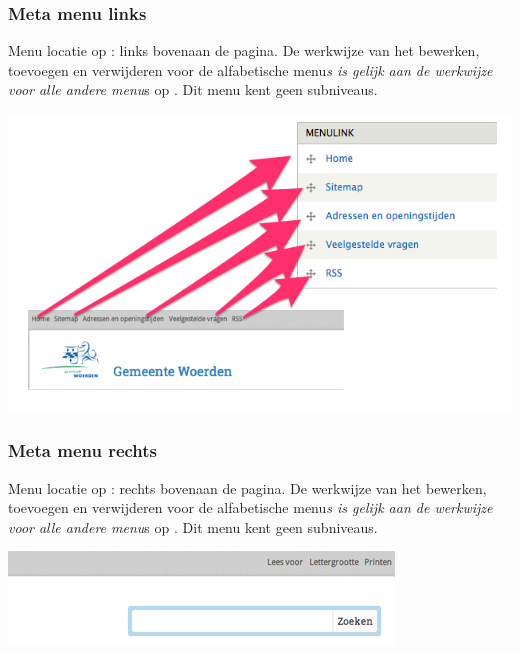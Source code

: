 \bigskip

\subsubsection{Meta menu links}\label{metamenulinks}
Menu locatie op \drupalpath{}: links bovenaan de pagina. De werkwijze van het bewerken, toevoegen en verwijderen voor de alfabetische menu\emph{s is gelijk aan de werkwijze voor alle andere menu}s op \drupalpath{}. Dit menu kent geen subniveaus.
\bigskip

\begin{center}
	\includegraphics[width=\textwidth]{img/meta-menu.png}
\end{center}

\bigskip

\subsubsection{Meta menu rechts}\label{metamenurechts}
Menu locatie op \drupalpath{}: rechts bovenaan de pagina. De werkwijze van het bewerken, toevoegen en verwijderen voor de alfabetische menu\emph{s is gelijk aan de werkwijze voor alle andere menu}s op \drupalpath{}. Dit menu kent geen subniveaus.
\bigskip

\begin{center}
	\includegraphics[width=\textwidth]{img/menu_metarechts.png}
\end{center}

